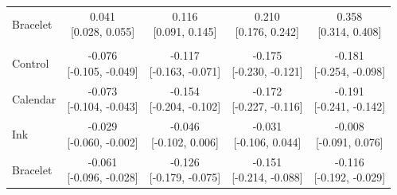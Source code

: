 \begin{tabular}{lcccc}
Bracelet & \makecell[c]{0.041\\{[0.028, 0.055]}} & \makecell[c]{0.116\\{[0.091, 0.145]}} & \makecell[c]{0.210\\{[0.176, 0.242]}} & \makecell[c]{0.358\\{[0.314, 0.408]}} \\
\addlinespace
\multicolumn{5}{l}{\textit{Panel C: Far minus Close}} \\
Control & \makecell[c]{-0.076\\{[-0.105, -0.049]}} & \makecell[c]{-0.117\\{[-0.163, -0.071]}} & \makecell[c]{-0.175\\{[-0.230, -0.121]}} & \makecell[c]{-0.181\\{[-0.254, -0.098]}} \\
Calendar & \makecell[c]{-0.073\\{[-0.104, -0.043]}} & \makecell[c]{-0.154\\{[-0.204, -0.102]}} & \makecell[c]{-0.172\\{[-0.227, -0.116]}} & \makecell[c]{-0.191\\{[-0.241, -0.142]}} \\
Ink & \makecell[c]{-0.029\\{[-0.060, -0.002]}} & \makecell[c]{-0.046\\{[-0.102, 0.006]}} & \makecell[c]{-0.031\\{[-0.106, 0.044]}} & \makecell[c]{-0.008\\{[-0.091, 0.076]}} \\
Bracelet & \makecell[c]{-0.061\\{[-0.096, -0.028]}} & \makecell[c]{-0.126\\{[-0.179, -0.075]}} & \makecell[c]{-0.151\\{[-0.214, -0.088]}} & \makecell[c]{-0.116\\{[-0.192, -0.029]}} \\
\bottomrule
\end{tabular}
